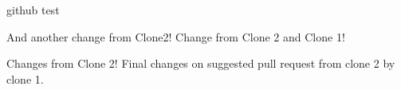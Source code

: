 \documentclass[10pt,a4paper]{report}
\begin{document}
github test

And another change from Clone2!
Change from Clone 2 and Clone 1!

Changes from Clone 2!
Final changes on suggested pull request from clone 2 by clone 1.
\end{document}

